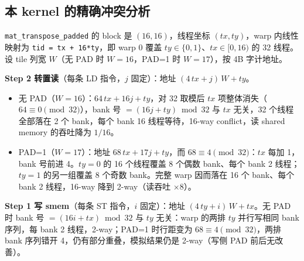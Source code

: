 \subsection{本 kernel 的精确冲突分析}

\texttt{mat\_\allowbreak{}transpose\_\allowbreak{}padded} 的 block 是 $(16,16)$，线程坐标 $(tx, ty)$，warp 内线性映射为 \texttt{tid = tx + 16*ty}，即 warp 0 覆盖 $ty \in \{0,1\}$、$tx \in [0,16)$ 的 32 线程。设 tile 列宽 $W$（无 PAD 时 $W = 16$，PAD=1 时 $W = 17$），按 4B 字计地址。

\textbf{Step 2 转置读}（每条 LD 指令，$j$ 固定）：地址 $(4\,tx + j)\,W + ty$。
\begin{itemize}
  \item 无 PAD（$W = 16$）：$64\,tx + 16j + ty$，对 32 取模后 $tx$ 项整体消失（$64 \equiv 0 \pmod{32}$），bank 号 $= (16j + ty) \bmod 32$ 与 $tx$ 无关，32 个线程全部落在 2 个 bank，每个 bank 16 线程等待，16-way conflict，读 shared memory 的吞吐降为 $1/16$。
  \item PAD=1（$W = 17$）：地址 $68\,tx + 17j + ty$，而 $68 \equiv 4 \pmod{32}$：$tx$ 每加 1，bank 号前进 4。$ty=0$ 的 16 个线程覆盖 8 个偶数 bank、每个 bank 2 线程；$ty=1$ 的另一组覆盖 8 个奇数 bank。完整 warp 因而落在 16 个 bank、每个 bank 2 线程，16-way 降到 2-way（读吞吐 $\times 8$）。
\end{itemize}

\textbf{Step 1 写 smem}（每条 ST 指令，$i$ 固定）：地址 $(4\,ty + i)\,W + tx$。无 PAD 时 bank 号 $= (16i + tx) \bmod 32$ 与 $ty$ 无关：warp 的两排 $ty$ 并行写相同 bank 序列，每 bank 2 线程，2-way；PAD=1 时行距变为 $68 \equiv 4 \pmod{32}$，两排 bank 序列错开 4，仍有部分重叠，模拟结果仍是 2-way（写侧 PAD 前后无改善）。

